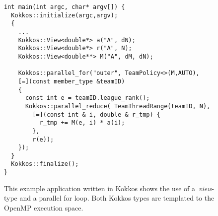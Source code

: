 \begin{figure}
\begin{small}
\begin{Verbatim}[frame=leftline]
int main(int argc, char* argv[]) {
  Kokkos::initialize(argc,argv);
  {
    ...
    Kokkos::View<double*> a("A", dN);  
    Kokkos::View<double*> r("A", N);
    Kokkos::View<double**> M("A", dM, dN);  

    Kokkos::parallel_for("outer", TeamPolicy<>(M,AUTO),
    [=](const member_type &teamID)
    {
      const int e = teamID.league_rank();
      Kokkos::parallel_reduce( TeamThreadRange(teamID, N),
        [=](const int & i, double & r_tmp) {
          r_tmp += M(e, i) * a(i);
        }, 
        r(e));
    }); 
  }
  Kokkos::finalize();
}
\end{Verbatim}
\end{small}
\caption{This example application written in Kokkos shows the use of a~\emph{view}-type and a parallel for loop. Both Kokkos types are templated to the OpenMP execution space.}
\label{fig:KokkosExample}
\end{figure}





